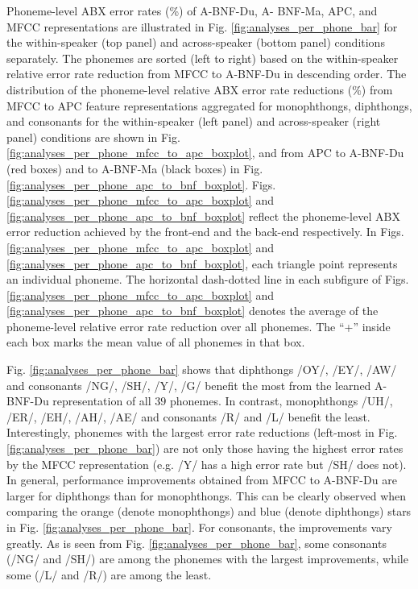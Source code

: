 \documentclass[transmag]{IEEEtran}
\begin{document}
Phoneme-level ABX error rates (\%) of A-BNF-Du, A-
BNF-Ma, APC, and MFCC representations are illustrated in Fig.
 \ref{fig:analyses_per_phone_bar} for the within-speaker (top panel) and across-speaker (bottom panel) conditions separately. The phonemes are sorted (left to right) based on the within-speaker relative error rate reduction from MFCC to A-BNF-Du in descending order. The distribution of the phoneme-level relative ABX error rate reductions ($\%$) from
MFCC to APC feature representations aggregated for monophthongs, diphthongs, and consonants for the within-speaker (left panel) and across-speaker (right panel) conditions are shown in Fig. \ref{fig:analyses_per_phone_mfcc_to_apc_boxplot}, and from APC to A-BNF-Du (red boxes) and to A-BNF-Ma (black boxes) in Fig.  \ref{fig:analyses_per_phone_apc_to_bnf_boxplot}.
Figs. \ref{fig:analyses_per_phone_mfcc_to_apc_boxplot} and \ref{fig:analyses_per_phone_apc_to_bnf_boxplot} reflect the phoneme-level ABX error reduction achieved by the front-end and the back-end respectively. 
In Figs. \ref{fig:analyses_per_phone_mfcc_to_apc_boxplot} and \ref{fig:analyses_per_phone_apc_to_bnf_boxplot}, each triangle point represents an individual phoneme. The horizontal dash-dotted line in each subfigure of Figs.  \ref{fig:analyses_per_phone_mfcc_to_apc_boxplot} and \ref{fig:analyses_per_phone_apc_to_bnf_boxplot}
denotes the average of the phoneme-level relative error rate reduction over all phonemes. The ``+'' inside each box marks the mean value of all phonemes in that box. 

Fig. \ref{fig:analyses_per_phone_bar} shows that diphthongs /OY/, /EY/, /AW/ and consonants /NG/, /SH/, /Y/, /G/ benefit the most from the learned A-BNF-Du representation of all $39$ phonemes. In contrast, monophthongs /UH/, /ER/, /EH/, /AH/, /AE/ and consonants /R/ and /L/ benefit the least. Interestingly, phonemes with the largest error rate reductions (left-most in Fig. \ref{fig:analyses_per_phone_bar}) are not only those having the highest error rates by the MFCC representation
(e.g. /Y/ has a high error rate but /SH/ does not).
In general, performance improvements obtained from MFCC to A-BNF-Du are larger for diphthongs than for monophthongs. 
This can be clearly observed when comparing the orange (denote monophthongs) and blue (denote diphthongs) stars in Fig.  \ref{fig:analyses_per_phone_bar}.
For consonants, the improvements vary greatly. As is seen from Fig. \ref{fig:analyses_per_phone_bar}, some consonants (/NG/ and /SH/) are among the phonemes with the largest improvements, while some (/L/ and /R/) are among the least.
\end{document}
